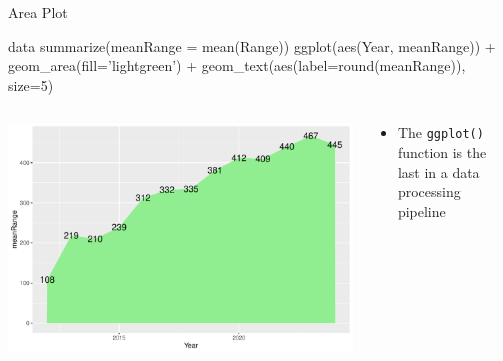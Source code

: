 \documentclass[ignorenonframetext,xcolor=x11names]{beamer}
\begin{document}
\begin{frame}[fragile]{Area Plot}
\footnotesize
\begin{Rcode}
data %
  summarize(meanRange = mean(Range)) %
  ggplot(aes(Year, meanRange)) + 
    geom_area(fill='lightgreen') +
    geom_text(aes(label=round(meanRange)), size=5)
\end{Rcode}
\begin{columns}
\begin{column}{.75\textwidth}
  \includegraphics[width=\textwidth]{fuel.areaOneSeries.pdf}
\end{column}
\begin{column}{.35\textwidth}
\begin{itemize}
   \item The \texttt{ggplot()} function is the last in a data processing pipeline
\end{itemize}
\end{column}
\end{columns}
\end{frame}
\end{document}
